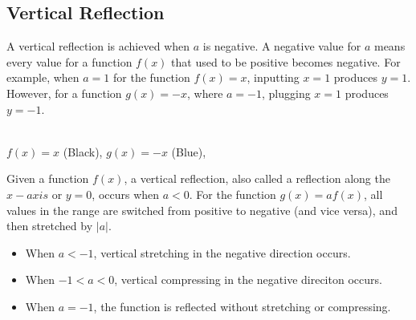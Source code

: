 \clearpage\subsection{Vertical Reflection}
A vertical reflection is achieved when $a$ is negative. A negative value for $a$ means every value for a function $f(x)$ that used to be positive becomes negative. For example, when $a = 1$ for the function $f(x) = x$, inputting $x = 1$ produces $y = 1$. However, for a function $g(x) = -x$, where $a = -1$, plugging $x = 1$ produces $y = -1$.
\begin{center}\vspace{-0.25cm}
    \\
    $f(x) = x$ (Black), 
    $g(x) = -x$ (Blue),
\end{center}
\begin{definition}
    Given a function $f(x)$, a vertical reflection, also called a reflection along the $x-axis$ or $y = 0$, occurs when $a < 0$. For the function $g(x) = af(x)$, all values in the range are switched from positive to negative (and vice versa), and then stretched by $|a|$.
    \begin{itemize}
        \item When $a < -1$, vertical stretching in the negative direction occurs.
        \item When $-1 < a < 0$, vertical compressing in the negative direciton occurs.
        \item When $a = -1$, the function is reflected without stretching or compressing.
    \end{itemize}
\end{definition}